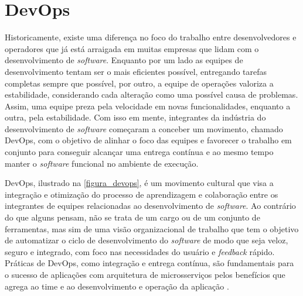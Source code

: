 

\section{DevOps}

Historicamente, existe uma diferença no foco do trabalho entre desenvolvedores e operadores que já está arraigada em muitas empresas que lidam com o desenvolvimento de \emph{software}. Enquanto por um lado as equipes de desenvolvimento tentam ser o mais eficientes possível, entregando tarefas completas sempre que possível, por outro, a equipe de operações valoriza a estabilidade, considerando cada alteração como uma possível causa de problemas. Assim, uma equipe preza pela velocidade em novas funcionalidades, enquanto a outra, pela estabilidade. Com isso em mente, integrantes da indústria do desenvolvimento de \emph{software} começaram a conceber um movimento, chamado DevOps, com o objetivo de alinhar o foco das equipes e favorecer o trabalho em conjunto para conseguir alcançar uma entrega contínua e ao mesmo tempo manter o \emph{software} funcional no ambiente de execução.

DevOps, ilustrado na \autoref{figura_devops}, é um movimento cultural que visa a integração e otimização do processo de aprendizagem e colaboração entre os integrantes de equipes relacionadas ao desenvolvimento de \emph{software}. Ao contrário do que alguns pensam, não se trata de um cargo ou de um conjunto de ferramentas, mas sim de uma visão organizacional de trabalho que tem o objetivo de automatizar o ciclo de desenvolvimento do \emph{software} de modo que seja veloz, seguro e integrado, com foco nas necessidades do usuário e \emph{feedback} rápido. Práticas de DevOps, como integração e entrega contínua, são fundamentais para o sucesso de aplicações com arquitetura de microsserviços pelos benefícios que agrega ao time e ao desenvolvimento e operação da aplicação \cite{gitlab-devops}.

